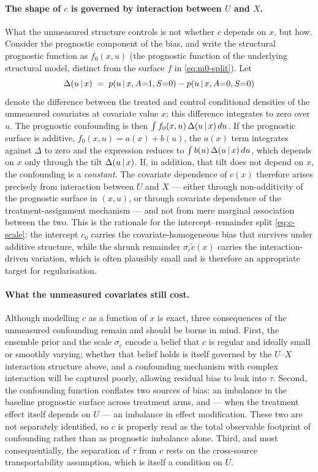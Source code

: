 \paragraph{The shape of $c$ is governed by interaction between $U$ and $X$.}
What the unmeasured structure controls is not whether $c$ depends on $x$, but
how. Consider the prognostic component of the bias, and write the structural
prognostic function as $f_0(x,u)$ (the prognostic function of the underlying
structural model, distinct from the surface $f$ in \eqref{eq:m0-split}). Let
\[
\Delta(u \,\vert\, x) \;=\;
  p(u \,\vert\, x, A{=}1, S{=}0) - p(u \,\vert\, x, A{=}0, S{=}0)
\]
denote the difference between the treated and control conditional densities of
the unmeasured covariates at covariate value $x$; this difference integrates to
zero over $u$. The prognostic confounding is then
$\int f_0(x,u)\,\Delta(u \,\vert\, x)\,du$. If the prognostic surface is additive,
$f_0(x,u) = a(x) + b(u)$, the $a(x)$ term integrates against $\Delta$ to zero
and the expression reduces to $\int b(u)\,\Delta(u \,\vert\, x)\,du$, which depends
on $x$ only through the tilt $\Delta(u \,\vert\, x)$. If, in addition, that tilt
does not depend on $x$, the confounding is a \emph{constant}. The covariate
dependence of $c(x)$ therefore arises precisely from interaction between $U$ and
$X$ --- either through non-additivity of the prognostic surface in $(x,u)$, or
through covariate dependence of the treatment-assignment mechanism --- and not
from mere marginal association between the two. This is the rationale for the
intercept--remainder split \eqref{eq:c-scale}: the intercept $c_0$ carries the
covariate-homogeneous bias that survives under additive structure, while the
shrunk remainder $\sigma_c \tilde c(x)$ carries the interaction-driven
variation, which is often plausibly small and is therefore an appropriate target
for regularisation.

\paragraph{What the unmeasured covariates still cost.}
Although modelling $c$ as a function of $x$ is exact, three consequences of the
unmeasured confounding remain and should be borne in mind. First, the ensemble
prior and the scale $\sigma_c$ encode a belief that $c$ is regular and ideally
small or smoothly varying; whether that belief holds is itself governed by the
$U$--$X$ interaction structure above, and a confounding mechanism with complex
interaction will be captured poorly, allowing residual bias to leak into $\tau$.
Second, the confounding function conflates two sources of bias: an imbalance in
the baseline prognostic surface across treatment arms, and --- when the
treatment effect itself depends on $U$ --- an imbalance in effect modification.
These two are not separately identified, so $c$ is properly read as the total
observable footprint of confounding rather than as prognostic imbalance alone.
Third, and most consequentially, the separation of $\tau$ from $c$ rests on the
cross-source transportability assumption, which is itself a condition on $U$.

